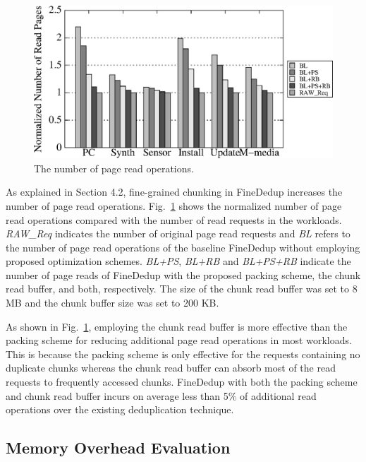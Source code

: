 \begin{figure}[t]
	\center
	\includegraphics[scale=0.75]{figure/finededup/increasedPageRead}
	\caption{The number of page read operations.} %
	\label{fig:pageread}
\end{figure}

As explained in Section 4.2, 
fine-grained chunking in FineDedup increases the number of page read operations. 
Fig.~\ref{fig:pageread} shows the normalized number of page read operations compared with the number of read requests
in the workloads.
\textit{RAW\_Req} indicates the number of original page read requests and \textit{BL} refers to the number of page
read operations of the baseline FineDedup without employing proposed optimization schemes. 
\textit{BL+PS}, \textit{BL+RB} and \textit{BL+PS+RB} indicate the number of page reads of FineDedup with the proposed
packing scheme, the chunk read buffer, and both, respectively. 
The size of the chunk read buffer was set to 8 MB and the chunk buffer size was set to 200 KB.

As shown in Fig.~\ref{fig:pageread}, employing the chunk read buffer is more effective than the packing scheme 
for reducing additional page read operations in most workloads. This is because the packing scheme is only
effective for the requests containing no duplicate chunks whereas the chunk read buffer can absorb most of the read requests 
to frequently accessed chunks.
FineDedup with both the packing scheme and chunk read buffer incurs on average less than 5\% of additional read operations
over the existing deduplication technique.

\subsection{Memory Overhead Evaluation}

